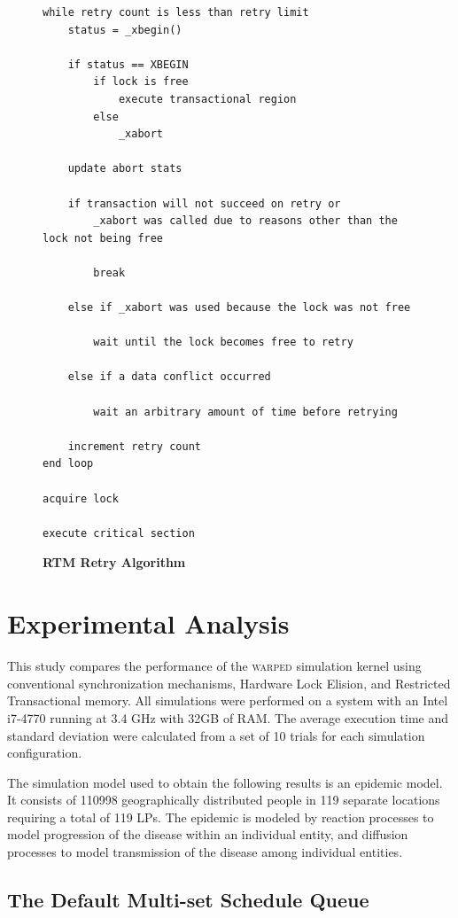 \documentclass[11pt]{book}
\begin{document}
\begin{figure}
\begin{verbatim}
while retry count is less than retry limit
    status = _xbegin()

    if status == XBEGIN
        if lock is free
            execute transactional region
        else
            _xabort

    update abort stats

    if transaction will not succeed on retry or 
        _xabort was called due to reasons other than the lock not being free

        break

    else if _xabort was used because the lock was not free

        wait until the lock becomes free to retry

    else if a data conflict occurred
        
        wait an arbitrary amount of time before retrying

    increment retry count
end loop

acquire lock

execute critical section
\end{verbatim}
\caption{\textbf{RTM Retry Algorithm}}\label{rtm_retry}
\end{figure}

\chapter{Experimental Analysis}

This study compares the performance of the \textsc{warped} simulation kernel using
conventional synchronization mechanisms, Hardware Lock Elision, and Restricted
Transactional memory.  All simulations were performed on a system with an Intel i7-4770
running at 3.4 GHz with 32GB of RAM.  The average execution time and standard deviation
were calculated from a set of 10 trials for each simulation configuration.

The simulation model used to obtain the following results is an epidemic model.  It
consists of 110998 geographically distributed people in 119 separate locations requiring a
total of 119 LPs.  The epidemic is modeled by reaction processes to model progression of
the disease within an individual entity, and diffusion processes to model transmission of
the disease among individual entities.

\section{The Default Multi-set Schedule Queue}
\end{document}
